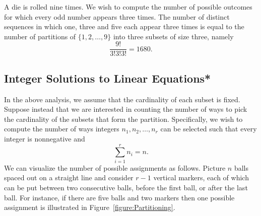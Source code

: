 \begin{example}
A die is rolled nine times.
We wish to compute the number of possible outcomes for which every odd number appears three times.
The number of distinct sequences in which one, three and five each appear three times is equal to the number of partitions of $\{ 1, 2, \ldots, 9 \}$ into three subsets of size three, namely
\begin{equation*}
\frac{9!}{3! 3! 3!} = 1680 .
\end{equation*}
\end{example}


\subsection{Integer Solutions to Linear Equations*}

In the above analysis, we assume that the cardinality of each subset is fixed.
Suppose instead that we are interested in counting the number of ways to pick the cardinality of the subsets that form the partition. 
Specifically, we wish to compute the number of ways integers $n_1, n_2, \ldots, n_r$ can be selected such that every integer is nonnegative and
\begin{equation*}
\sum_{i = 1}^r n_i = n.
\end{equation*}
We can visualize the number of possible assignments as follows.
Picture $n$ balls spaced out on a straight line and consider $r-1$ vertical markers, each of which can be put between two consecutive balls, before the first ball, or after the last ball. 
For instance, if there are five balls and two markers then one possible assignment is illustrated in Figure~\ref{figure:Partitioning}.

